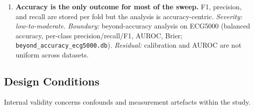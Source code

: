 \documentclass[12pt, a4paper]{report}
\theoremstyle{definition}
\theoremstyle{plain}
\theoremstyle{remark}
\begin{document}
\begin{enumerate}
    scores 79.30\%, rank 3 of 84). \emph{Severity: high for any
    single-split number.} \emph{Boundary:} all headline claims
    rest on the $r{=}25$ repeated-CV protocol with corrected CIs
    (repeated-measures: vectorizer [6.13, 6.65], classifier [3.28,
    3.71], filtration [0.57, 0.81], all excluding zero; Nadeau--Bengio
    corrected: [5.69, 7.10], [2.92, 4.07], [0.37, 1.01]) and
    Friedman/sign-test inference on the repetition-level ordering
    (vectorizer $>$ classifier $>$ filtration in 25/25 repetitions);
    single-split numbers are labelled as such throughout. \emph{Boundary:}
    MNIST binary is $r{=}5$; ECG5000, the matched-genus control, and the panel follow the
    $r{=}25$ protocol (\S4.1).
  \item \textbf{Accuracy is the only outcome for most of the sweep.} F1,
    precision, and recall are stored per fold but the analysis is
    accuracy-centric. \emph{Severity: low-to-moderate.} \emph{Boundary:} beyond-accuracy analysis on ECG5000 (balanced accuracy,
    per-class precision/recall/F1, AUROC, Brier;
    \texttt{beyond\_accuracy\_}\allowbreak\texttt{ecg5000.db}).
    \emph{Residual:} calibration and AUROC are not
    uniform across datasets.
\end{enumerate}

\subsection{Design Conditions}
\label{sec:threats_internal}

Internal validity concerns confounds and measurement artefacts within the
study.
\end{document}
